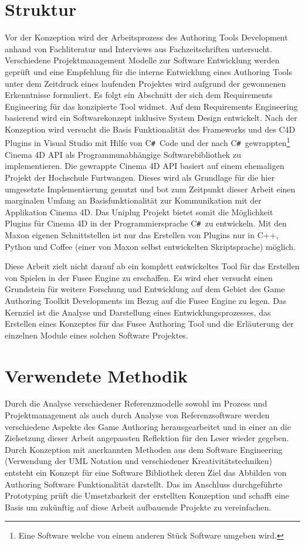 \documentclass[pagesize, paper=a4, fontsize=12pt, titlepage=true, headings=small, headnosepline, abstractoff, liststotoc, nochapterprefix, plainheadsepline, twoside]{scrreprt}
\newcommand{\CSS}{C\texttt{\# }}
\begin{document}
\section{Struktur}
Vor der Konzeption wird der Arbeitsprozess des Authoring Tools Development anhand von Fachliteratur und Interviews aus Fachzeitschriften untersucht. Verschiedene Projektmanagement Modelle zur Software Entwicklung werden geprüft und eine Empfehlung für die interne Entwicklung eines Authoring Tools unter dem Zeitdruck eines laufenden Projektes wird aufgrund der gewonnenen Erkenntnisse formuliert. Es folgt ein Abschnitt der sich dem Requirements Engineering für das konzipierte Tool widmet. Auf dem Requirements Engineering basierend wird ein Softwarekonzept inklusive System Design entwickelt. Nach der Konzeption wird versucht die Basis Funktionalität des Frameworks und des C4D Plugins in Visual Studio mit Hilfe von \CSS Code und der nach \CSS gewrappten\footnote{Eine Software welche von einem anderen Stück Software umgeben wird.} Cinema 4D API als Programmunabhängige Softwarebibliothek zu implementieren. Die gewrappte Cinema 4D API basiert auf einem ehemaligen Projekt der Hochschule Furtwangen. Dieses wird als Grundlage für die hier umgesetzte Implementierung genutzt und bot zum Zeitpunkt dieser Arbeit einen marginalen Umfang an Basisfunktionalität zur Kommunikation mit der Applikation Cinema 4D. Das Uniplug Projekt bietet somit die Möglichkeit Plugins für Cinema 4D in der Programmiersprache \CSS zu entwickeln. Mit den Maxon eigenen Schnittstellen ist nur das Erstellen von Plugins nur in C++, Python und Coffee (einer von Maxon selbst entwickelten Skriptsprache) möglich.

Diese Arbeit zielt nicht darauf ab ein komplett entwickeltes Tool für das Erstellen von Spielen in der Fusee Engine zu erschaffen. Es wird eher versucht einen Grundstein für weitere Forschung und Entwicklung auf dem Gebiet des Game Authoring Toolkit Developments im Bezug auf die Fusee Engine zu legen. Das Kernziel ist die Analyse und Darstellung eines Entwicklungsprozesses, das Erstellen eines Konzeptes für das Fusee Authoring Tool und die Erläuterung der einzelnen Module eines solchen Software Projektes.

\section{Verwendete Methodik}
Durch die Analyse verschiedener Referenzmodelle sowohl im Prozess und Projektmanagement als auch durch Analyse von Referenzsoftware werden verschiedene Aspekte des Game Authoring herausgearbeitet und in einer an die Zielsetzung dieser Arbeit angepassten Reflektion für den Leser wieder gegeben.
Durch Konzeption mit anerkannten Methoden aus dem Software Engineering (Verwendung der UML Notation und verschiedener Kreativitätstechniken) entsteht ein Konzept für eine Software Bibliothek deren Ziel das Abbilden von Authoring Software Funktionalität darstellt.
Das im Anschluss durchgeführte Prototyping prüft die Umsetzbarkeit der erstellten Konzeption und schafft eine Basis um zukünftig auf diese Arbeit aufbauende Projekte zu vereinfachen.
\end{document}
